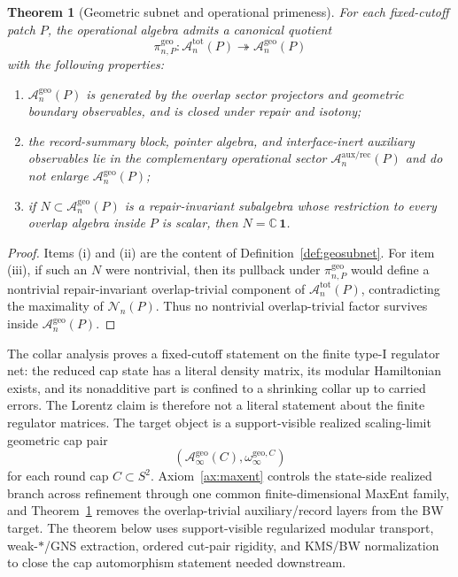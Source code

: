 \documentclass[11pt]{article}
\newtheorem{theorem}{Theorem}[section]
\begin{document}
\begin{theorem}[Geometric subnet and operational primeness]\label{thm:geosubnet}
For each fixed-cutoff patch \(P\), the operational algebra admits a canonical quotient
\[
\pi_{n,P}^{\mathrm{geo}}:\mathcal A_n^{\mathrm{tot}}(P)\twoheadrightarrow \mathcal A_n^{\mathrm{geo}}(P)
\]
with the following properties:
\begin{enumerate}[label=\textup{(\roman*)},leftmargin=2em]
\item \(\mathcal A_n^{\mathrm{geo}}(P)\) is generated by the overlap sector projectors and geometric boundary observables, and is closed under repair and isotony;
\item the record-summary block, pointer algebra, and interface-inert auxiliary observables lie in the complementary operational sector \(\mathcal A_n^{\mathrm{aux/rec}}(P)\) and do not enlarge \(\mathcal A_n^{\mathrm{geo}}(P)\);
\item if \(N\subset \mathcal A_n^{\mathrm{geo}}(P)\) is a repair-invariant subalgebra whose restriction to every overlap algebra inside \(P\) is scalar, then \(N=\mathbb C\,\mathbf 1\).
\end{enumerate}
\end{theorem}

\begin{proof}
Items \textup{(i)} and \textup{(ii)} are the content of Definition~\ref{def:geosubnet}. For item \textup{(iii)}, if such an \(N\) were nontrivial, then its pullback under \(\pi_{n,P}^{\mathrm{geo}}\) would define a nontrivial repair-invariant overlap-trivial component of \(\mathcal A_n^{\mathrm{tot}}(P)\), contradicting the maximality of \(\mathcal N_n(P)\). Thus no nontrivial overlap-trivial factor survives inside \(\mathcal A_n^{\mathrm{geo}}(P)\).
\end{proof}

The collar analysis proves a fixed-cutoff statement on the finite type-I regulator net: the reduced cap state has a literal density matrix, its modular Hamiltonian exists, and its nonadditive part is confined to a shrinking collar up to carried errors. The Lorentz claim is therefore not a literal statement about the finite regulator matrices. The target object is a support-visible realized scaling-limit geometric cap pair
\[
(\mathcal A_\infty^{\mathrm{geo}}(C),\omega_\infty^{\mathrm{geo},C})
\]
for each round cap \(C\subset S^2\). Axiom~\ref{ax:maxent} controls the state-side realized branch across refinement through one common finite-dimensional MaxEnt family, and Theorem~\ref{thm:geosubnet} removes the overlap-trivial auxiliary/record layers from the BW target. The theorem below uses support-visible regularized modular transport, weak-\(*\)/GNS extraction, ordered cut-pair rigidity, and KMS/BW normalization to close the cap automorphism statement needed downstream.
\end{document}
